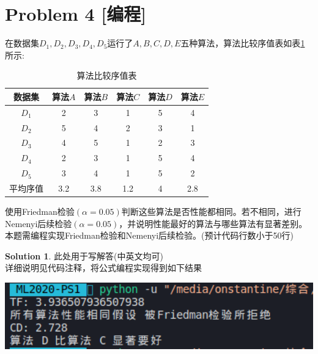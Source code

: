 \documentclass[a4paper,UTF8]{article}
\theoremstyle{definition}
\newtheorem*{solution}{Solution}
\begin{document}
\section*{Problem 4 [编程]} 
在数据集$D_1,D_2,D_3,D_4,D_5$运行了$A,B,C,D,E$五种算法，算法比较序值表如表\ref{table:ranking}所示:
\begin{table}[h]
\centering
\caption{算法比较序值表} \vspace{2mm}\label{table:ranking}
\begin{tabular}{c|c c c c c}\hline
数据集 & 算法$A$ & 算法$B$  & 算法$C$  &算法$D$  &算法$E$ \\
\hline
$D_1$ & 2  & 3 &  1 &  5  & 4\\
$D_2$ & 5  & 4 &  2 &  3  & 1\\
$D_3$ & 4  & 5 &  1 &  2  & 3\\
$D_4$ & 2  & 3 &  1 &  5  & 4\\
$D_5$ & 3  & 4 &  1 &  5  & 2\\
\hline
平均序值 & 3.2 &  3.8 & 1.2 &  4 &  2.8 \\
\hline
\end{tabular}
\end{table}

使用Friedman检验$(\alpha=0.05)$判断这些算法是否性能都相同。若不相同，进行Nemenyi后续检验$(\alpha=0.05)$，并说明性能最好的算法与哪些算法有显著差别。本题需编程实现Friedman检验和Nemenyi后续检验。(预计代码行数小于50行)
\begin{solution}
此处用于写解答(中英文均可)
~\\
详细说明见代码注释，将公式编程实现得到如下结果

\includegraphics[width=1\textwidth]{Pr4.png}
~\\
\end{solution}
\end{document}
